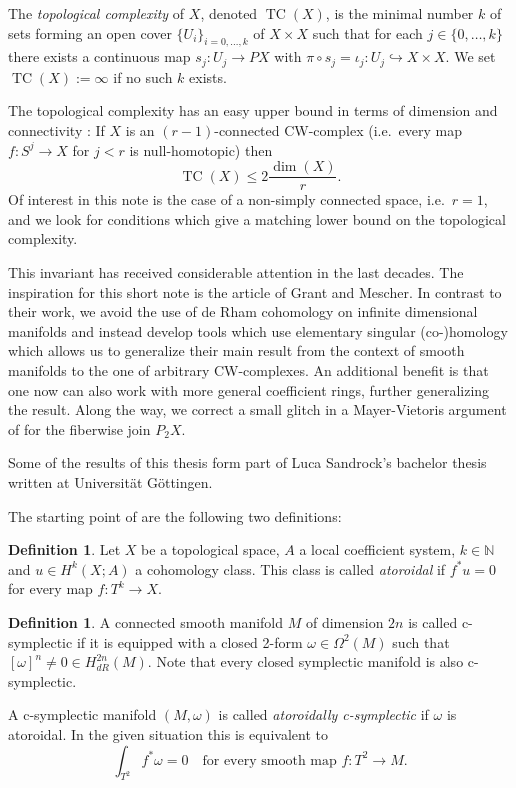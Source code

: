 \documentclass[a4paper,twoside]{article}
\theoremstyle{plain}
\theoremstyle{definition}
\newtheorem{definition}[theorem]{Definition}
\theoremstyle{remark}
\newcommand{\naturals}{\mathbb{N}}
\newcommand{\into}{\hookrightarrow}
\DeclareMathOperator{\TC}{TC}
\begin{document}
The \emph{topological complexity} of $X$, denoted $\TC(X)$, is the minimal
number $k$ of sets forming an open cover $\{U_i\}_{i=0,\dots, k}$ of
$X\times X$ such that for each $j\in\{0,\dots,k\}$ there exists a continuous
map $s_j\colon U_j\to PX$ with $\pi\circ s_j = \iota_j\colon U_j\into X\times
X$. We set $\TC(X):=\infty$ if no such $k$ exists.

The topological complexity has an easy upper bound in terms of dimension and
connectivity \cite[Theorem 5.2]{Farber_instabilities}: If $X$ is an
$(r-1)$-connected CW-complex (i.e.~every map $f\colon S^j\to X$ for $j<r$ is
null-homotopic) then
\begin{equation*}
  \TC(X)\le 2\frac{\dim(X)}{r}.
\end{equation*}
Of interest in this note is the case of a non-simply connected space, i.e.~$r=1$,
and we look for conditions which give a matching lower bound on the
topological complexity. 

This invariant has received considerable attention in the last decades. The
inspiration for this short note is the article \cite{GrantMescher} of Grant
and Mescher. In contrast to their work, we avoid the use of de Rham cohomology
on infinite dimensional manifolds and instead develop tools which use elementary
singular (co-)homology which allows us to generalize their main result from the
context of smooth manifolds to the one of arbitrary CW-complexes. An additional
benefit is that one now can also work with more general coefficient rings, further
generalizing the result. Along the way, we correct a small glitch in a Mayer-Vietoris
argument of \cite{GrantMescher} for the fiberwise join $P_2X$.

Some of the results of this thesis form part of Luca Sandrock's
bachelor thesis \cite{Sandrock} written at Universit\"at G\"ottingen.

The starting point of \cite{GrantMescher} are the following two definitions:

\begin{definition}
  Let $X$ be a topological space, $A$ a local coefficient system,
  $k\in\naturals$ and $u\in 
  H^k(X;A)$ a cohomology class. This class is called \emph{atoroidal} if
  $f^*u=0$ for every map $f\colon T^k\to X$.
\end{definition}
\begin{definition}
  A connected smooth manifold $M$ of dimension $2n$ is called c-symplectic if
  it is equipped with a closed 2-form $\omega\in\Omega^2(M)$ such that
  $[\omega]^n \ne 0\in H^{2n}_{dR}(M)$. Note that every closed symplectic
  manifold is also c-symplectic.

  A c-symplectic manifold $(M,\omega)$ is called \emph{atoroidally c-symplectic}
  if $\omega$ is atoroidal. In the given situation this is equivalent to
  \begin{equation*}
    \int_{T^2}f^*\omega =0 \quad\text{for every smooth map } f\colon T^2\to M.
  \end{equation*}
\end{definition}
\end{document}
